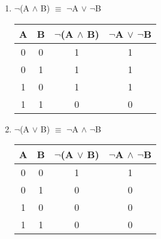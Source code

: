 \documentclass[12pt]{article}
\begin{document}
\begin{enumerate}

  \item $\neg$(A $\land$ B) $\equiv$ $\neg$A $\lor$ $\neg$B

\begin{center}
  \begin{tabular}{| c | c | c | c |}
    \hline
    A & B & $\neg$(A $\land$ B) & $\neg$A $\lor$ $\neg$B \\ \hline
    0 & 0 & 1 & 1 \\
    0 & 1 & 1 & 1 \\ 
    1 & 0 & 1 & 1 \\
    1 & 1 & 0 & 0 \\ \hline
  \end{tabular}
\end{center}

  \item $\neg$(A $\lor$ B) $\equiv$ $\neg$A $\land$ $\neg$B

\begin{center}
  \begin{tabular}{| c | c | c | c |}
    \hline
    A & B & $\neg$(A $\lor$ B) & $\neg$A $\land$ $\neg$B \\ \hline
    0 & 0 & 1 & 1 \\
    0 & 1 & 0 & 0 \\ 
    1 & 0 & 0 & 0 \\
    1 & 1 & 0 & 0 \\ \hline
  \end{tabular}
\end{center}
\end{enumerate}
\end{document}
